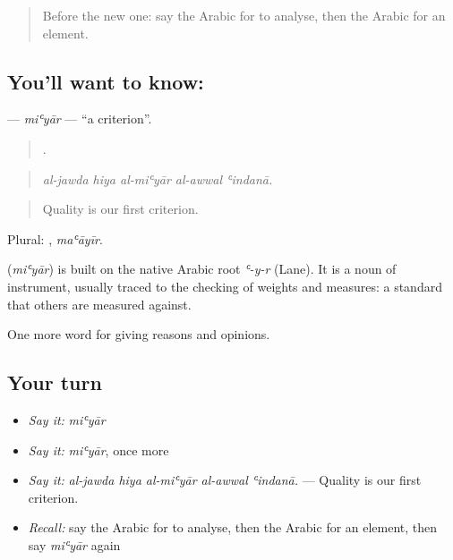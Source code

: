 \label{lesson:AR-C364-miyar}



\begin{quote}
Before the new one: say the Arabic for to analyse, then the Arabic for an element.
\end{quote}

\subsection*{You'll want to know: }
\textbf{} — \emph{miʿyār} — \textquotedblleft{}a criterion\textquotedblright{}.

\begin{quote}
    .
\end{quote}

\begin{quote}
\emph{al-jawda hiya al-miʿyār al-awwal ʿindanā.}
\end{quote}

\begin{quote}
Quality is our first criterion.
\end{quote}

Plural: , \emph{maʿāyīr}.

\begin{cousinweb}
\textbf{} (\emph{miʿyār}) is built on the native Arabic root \emph{ʿ-y-r} (Lane). It is a noun of instrument, usually traced to the checking of weights and measures: a standard that others are measured against.
\end{cousinweb}

\begin{grammarlens}[title={What you've built}]
One more word for giving reasons and opinions.
\end{grammarlens}

\subsection*{Your turn}
\begin{itemize}
\raggedright
  \item \emph{Say it:} \emph{miʿyār}
  \item \emph{Say it:} \emph{miʿyār}, once more
  \item \emph{Say it:} \emph{al-jawda hiya al-miʿyār al-awwal ʿindanā.} — Quality is our first criterion.
  \item \emph{Recall:} say the Arabic for to analyse, then the Arabic for an element, then say \emph{miʿyār} again
\end{itemize}

